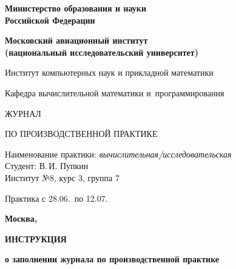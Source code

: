 \documentclass[dvipsnames,pdf, unicode, 12pt, a4paper, oneside, fleqn]{article}
\begin{document}
\begin{titlepage}
\begin{center}
\bfseries{\Large Министерство образования и науки\\Российской Федерации}

\vspace{12pt}

\bfseries{\Large Московский авиационный институт\\ (национальный исследовательский университет)}

\vspace{48pt}


{\large Институт компьютерных наук и прикладной математики}

\vspace{36pt}


{\large Кафедра вычислительной математики и~программирования}

\vspace{48pt}

{\huge ЖУРНАЛ}

\vspace{12pt}

{\large ПО ПРОИЗВОДСТВЕННОЙ ПРАКТИКЕ}


\end{center}

\vspace{72pt}

\begin{flushleft}
Наименование практики: {\itshape вычислительная/исследовательская}\\
Студент: В.\,И. Пупкин \\
Институт №8, курс 3, группа 7 \\
\end{flushleft}

\vspace{12pt}

\begin{flushleft}
Практика с 28.06.\the\year\, по 12.07.\the\year
\end{flushleft}

\vfill

\begin{center}
\bfseries Москва, \the\year
\end{center}
\end{titlepage}

\pagebreak

\begin{center}
\bfseries{\large ИНСТРУКЦИЯ }

\vspace{12pt}

\bfseries{о заполнении журнала по производственной практике}
\end{center}
\end{document}
